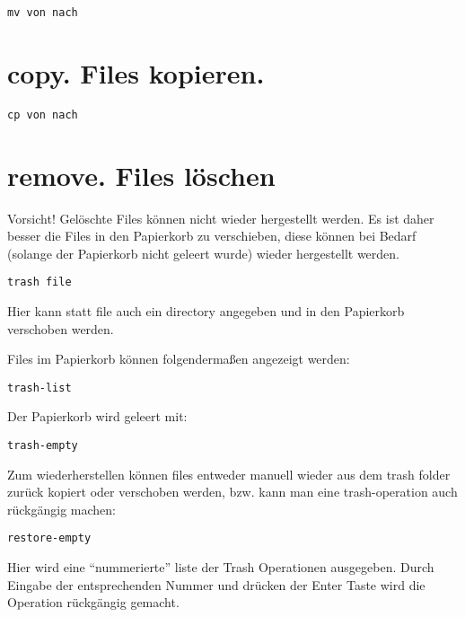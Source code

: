 \documentclass[]{book}
\begin{document}
\begin{verbatim}
mv von nach
\end{verbatim}

\hypertarget{copy.-files-kopieren.}{%
\section{copy. Files kopieren.}\label{copy.-files-kopieren.}}

\begin{verbatim}
cp von nach
\end{verbatim}

\hypertarget{remove.-files-loschen}{%
\section{remove. Files löschen}\label{remove.-files-loschen}}

Vorsicht! Gelöschte Files können nicht wieder hergestellt werden.
Es ist daher besser die Files in den Papierkorb zu verschieben, diese
können bei Bedarf (solange der Papierkorb nicht geleert wurde) wieder
hergestellt werden.

\begin{verbatim}
trash file
\end{verbatim}

Hier kann statt file auch ein directory angegeben und in den Papierkorb verschoben werden.

Files im Papierkorb können folgendermaßen angezeigt werden:

\begin{verbatim}
trash-list
\end{verbatim}

Der Papierkorb wird geleert mit:

\begin{verbatim}
trash-empty
\end{verbatim}

Zum wiederherstellen können files entweder manuell wieder
aus dem trash folder zurück kopiert oder verschoben werden, bzw. kann man eine trash-operation auch rückgängig machen:

\begin{verbatim}
restore-empty
\end{verbatim}

Hier wird eine ``nummerierte'' liste der Trash Operationen ausgegeben. Durch Eingabe der entsprechenden Nummer und drücken der Enter Taste wird die
Operation rückgängig gemacht.
\end{document}
